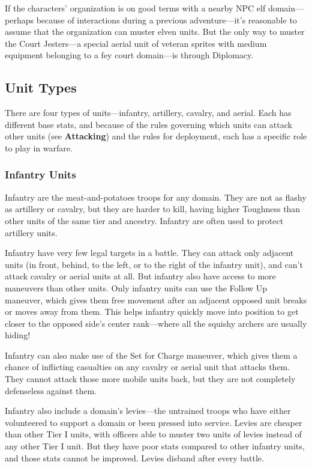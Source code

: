 \documentclass[10pt,a4paper,twoside,bg=print,twocolumn,openany,nodeprecatedcode]{dndbook}
\begin{document}
If the characters' organization is on good terms with a nearby NPC elf domain—perhaps because of interactions during a previous adventure—it's reasonable to assume that the organization can muster elven units. But the only way to muster the Court Jesters—a special aerial unit of veteran sprites with medium equipment belonging to a fey court domain—is through Diplomacy.

\subsection{Unit Types}
There are four types of units—infantry, artillery, cavalry, and aerial. Each has different base stats, and because of the rules governing which units can attack other units (see \textbf{Attacking}) and the rules for deployment, each has a specific role to play in warfare.

\subsubsection{Infantry Units}
Infantry are the meat-and-potatoes troops for any domain. They are not as flashy as artillery or cavalry, but they are harder to kill, having higher Toughness than other units of the same tier and ancestry. Infantry are often used to protect artillery units.

Infantry have very few legal targets in a battle. They can attack only adjacent units (in front, behind, to the left, or to the right of the infantry unit), and can't attack cavalry or aerial units at all. But infantry also have access to more maneuvers than other units. Only infantry units can use the Follow Up maneuver, which gives them free movement after an adjacent opposed unit breaks or moves away from them. This helps infantry quickly move into position to get closer to the opposed side's center rank—where all the squishy archers are usually hiding!

Infantry can also make use of the Set for Charge maneuver, which gives them a chance of inflicting casualties on any cavalry or aerial unit that attacks them. They cannot attack those more mobile units back, but they are not completely defenseless against them.

Infantry also include a domain's levies—the untrained troops who have either volunteered to support a domain or been pressed into service. Levies are cheaper than other Tier I units, with officers able to muster two units of levies instead of any other Tier I unit. But they have poor stats compared to other infantry units, and those stats cannot be improved. Levies disband after every battle.
\end{document}
